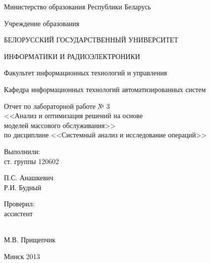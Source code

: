 \thispagestyle{empty}

\begin{center}
Министерство образования Республики Беларусь\par
\vspace{2mm}
Учреждение образования\par
БЕЛОРУССКИЙ ГОСУДАРСТВЕННЫЙ УНИВЕРСИТЕТ\par
ИНФОРМАТИКИ И РАДИОЭЛЕКТРОНИКИ\par 
\vspace{2mm}
Факультет информационных технологий и управления\par
\vspace{2mm}
Кафедра информационных технологий автоматизированных систем\par

\end{center}

\vspace{50mm}

\begin{center}
  Отчет по лабораторной работе № 3 \\
  <<Анализ и оптимизация решений на основе \\ моделей массового обслуживания>> \\
  по дисциплине <<Системный анализ и исследование операций>>
\end{center}

\vspace{40mm}

\begin{multicols}{2}
  \begin{flushleft}
    Выполнили: \\
    ст. группы 120602
  \end{flushleft}

  \begin{flushright}
    П.С. Анашкевич \\
    Р.И. Будный \\
  \end{flushright}
\end{multicols}

\begin{multicols}{2}
  \begin{flushleft}
    Проверил: \\
    ассистент
  \end{flushleft}

  \begin{flushright}
    \textcolor{white}{whitespace} \\
    М.В. Прищепчик 
  \end{flushright}
\end{multicols}

\vspace{30mm}
\begin{center}
Минск 2013
\end{center}

\newpage